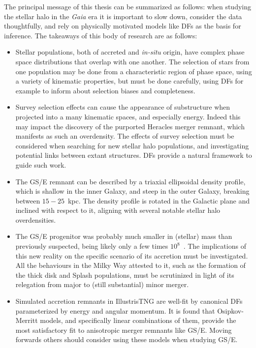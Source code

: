 The principal message of this thesis can be summarized as follows: when studying the stellar halo in the \textit{Gaia} era it is important to slow down, consider the data thoughtfully, and rely on physically motivated models like DFs as the basis for inference. The takeaways of this body of research are as follows:

\begin{itemize}
    \item Stellar populations, both of accreted and \textit{in-situ} origin, have complex phase space distributions that overlap with one another. The selection of stars from one population may be done from a characteristic region of phase space, using a variety of kinematic properties, but must be done carefully, using DFs for example to inform about selection biases and completeness.
    \item Survey selection effects can cause the appearance of substructure when projected into a many kinematic spaces, and especially energy. Indeed this may impact the discovery of the purported Heracles merger remnant, which manifests as such an overdensity. The effects of survey selection must be considered when searching for new stellar halo populations, and investigating potential links between extant structures. DFs provide a natural framework to guide such work.
    \item The GS/E remnant can be described by a triaxial ellipsoidal density profile, which is shallow in the inner Galaxy, and steep in the outer Galaxy, breaking between $15-25$~kpc. The density profile is rotated in the Galactic plane and inclined with respect to it, aligning with several notable stellar halo overdensities.
    \item The GS/E progenitor was probably much smaller in (stellar) mass than previously suspected, being likely only a few times $10^{8}$~\Msun. The implications of this new reality on the specific scenario of its accretion must be investigated. All the behaviours in the Milky Way attested to it, such as the formation of the thick disk and Splash populations, must be scrutinized in light of its relegation from major to (still substantial) minor merger.
    \item Simulated accretion remnants in IllustrisTNG are well-fit by canonical DFs parameterized by energy and angular momentum. It is found that Osipkov-Merritt models, and specifically linear combinations of them, provide the most satisfactory fit to anisotropic merger remnants like GS/E. Moving forwards others should consider using these models when studying GS/E.
\end{itemize}

